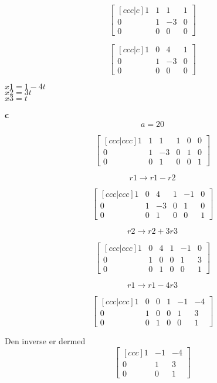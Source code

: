 \documentclass[12pt,a4paper]{article}
\begin{document}
\[
\begin{bmatrix}[ccc|c]
  1 & 1 & 1 & 1 \\
  0 & 1 & -3  &  0 \\
  0 & 0 & 0 &  0
\end{bmatrix}
\]

\[
\begin{bmatrix}[ccc|c]
  1 & 0 & 4 & 1 \\
  0 & 1 & -3  &  0 \\
  0 & 0 & 0 &  0
\end{bmatrix}
\]

$x1 = 1 - 4t$\\
$x2 = 3t$\\
$x3 = t$

\textbf{c}\\

\[a = 20\]

\[
\begin{bmatrix}[ccc|ccc]
  1 & 1 & 1 & 1 & 0 & 0 \\
  0 & 1 & -3  &  0 & 1 & 0 \\
  0 & 0 & 1 &  0 & 0 & 1
\end{bmatrix}
\]

\[ r1 \rightarrow r1 - r2 \]

\[
\begin{bmatrix}[ccc|ccc]
  1 & 0 & 4 & 1 & -1 & 0 \\
  0 & 1 & -3  &  0 & 1 & 0 \\
  0 & 0 & 1 &  0 & 0 & 1
\end{bmatrix}
\]

\[ r2 \rightarrow r2 + 3r3 \]

\[
\begin{bmatrix}[ccc|ccc]
  1 & 0 & 4 & 1 & -1 & 0 \\
  0 & 1 & 0  &  0 & 1 & 3 \\
  0 & 0 & 1 &  0 & 0 & 1
\end{bmatrix}
\]

\[ r1 \rightarrow r1 - 4r3 \]

\[
\begin{bmatrix}[ccc|ccc]
  1 & 0 & 0 & 1 & -1 & -4 \\
  0 & 1 & 0  &  0 & 1 & 3 \\
  0 & 0 & 1 &  0 & 0 & 1
\end{bmatrix}
\]

Den inverse er dermed\\

\[ 
\begin{bmatrix}[ccc]
  1 & -1 & -4 \\
  0 & 1 & 3 \\
  0 & 0 & 1
\end{bmatrix}
\]
\end{document}
